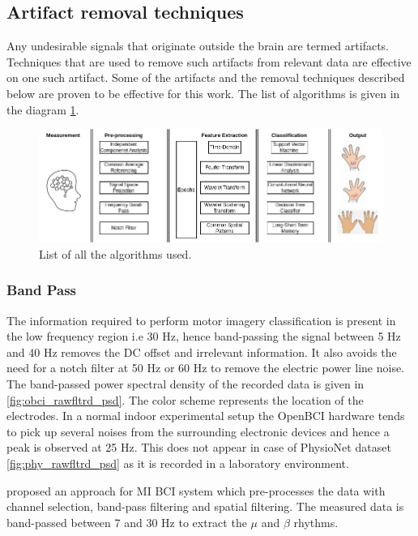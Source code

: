 \subsection{Artifact removal techniques}
Any undesirable signals that originate outside the brain are termed artifacts. Techniques that are used to remove such artifacts from relevant data are effective on one such artifact. Some of the artifacts and the removal techniques described below are proven to be effective for this work. The list of algorithms is given in the diagram \ref{fig:Algorithm_overview}.

\begin{figure}[H] 
    \begin{center}
    \includegraphics[width =1.0\textwidth]{images/Algorithm_overview.png}
    \caption{List of all the algorithms used.}
    \label{fig:Algorithm_overview}
    \end{center}
\end{figure}

\subsubsection{Band Pass}
The information required to perform motor imagery classification is present in the low frequency region i.e 30 Hz, hence band-passing the signal between 5 Hz and 40 Hz removes the DC offset and irrelevant information. It also avoids the need for a notch filter at 50 Hz or 60 Hz to remove the electric power line noise. The band-passed power spectral density of the recorded data is given in \ref{fig:obci_rawfltrd_psd}. The color scheme represents the location of the electrodes. In a normal indoor experimental setup the OpenBCI hardware tends to pick up several noises from the surrounding electronic devices and hence a peak is observed at 25 Hz. This does not appear in case of PhysioNet dataset \ref{fig:phy_rawfltrd_psd} as it is recorded in a laboratory environment.

\cite{2017_MI_ML_SP} proposed an approach for MI BCI system which pre-processes the data with channel selection, band-pass filtering and spatial filtering. The measured data is band-passed between 7 and 30 Hz to extract the $\mu$ and $\beta$ rhythms.

